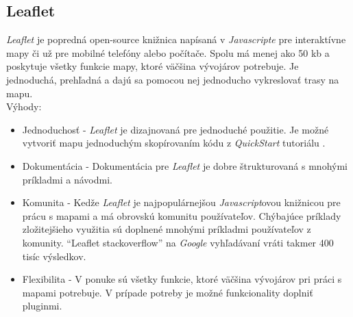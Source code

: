 \subsection{Leaflet \label{section:leaflet}}
\indent \indent \textit{Leaflet} je popredná open-source knižnica napísaná v \textit{Javascripte} pre interaktívne mapy či už pre mobilné telefóny alebo počítače. Spolu má menej ako 50 \acrshort{kb} a poskytuje všetky funkcie mapy, ktoré väčšina vývojárov potrebuje\cite{leaflet}. Je jednoduchá, prehľadná a dajú sa pomocou nej jednoducho vykreslovať trasy na mapu.\\
Výhody\cite{leaflet-pros}: 
\begin{itemize}
    \item Jednoduchosť - \textit{Leaflet} je dizajnovaná pre jednoduché použitie. Je možné vytvoriť mapu jednoduchým skopírovaním kódu z \textit{QuickStart} tutoriálu \cite{leaflet-quickstart}.
    \item Dokumentácia - Dokumentácia pre \textit{Leaflet} je dobre štrukturovaná s mnohými príkladmi a návodmi.
    \item Komunita - Kedže \textit{Leaflet} je najpopulárnejšou \textit{Javascript}ovou knižnicou pre prácu s mapami a má obrovskú komunitu používateľov. Chýbajúce príklady zložitejšieho využitia sú doplnené mnohými príkladmi používateľov z komunity. ``Leaflet stackoverflow'' na \textit{Google} vyhľadávaní vráti takmer 400 tisíc výsledkov. 
    \item Flexibilita - V ponuke sú všetky funkcie, ktoré väčšina vývojárov pri práci s mapami potrebuje. V prípade potreby je možné funkcionality doplniť pluginmi.
\end{itemize} 